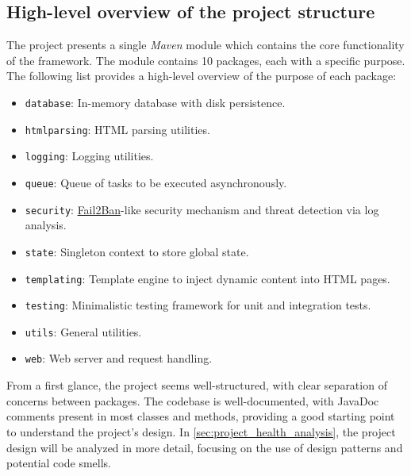\subsection{High-level overview of the project structure}
\label{sec:project_structure}

The project presents a single \textit{Maven} module which contains the core functionality of the framework. The module contains 10 packages, each with a specific purpose. The following list provides a high-level overview of the purpose of each package:

\vspace{1em}
\noindent
\begin{minipage}{0.5\textwidth}
	\begin{itemize}
		\item \texttt{database}: In-memory database with disk persistence.
		\item \texttt{htmlparsing}: HTML parsing utilities.
		\item \texttt{logging}: Logging utilities.
		\item \texttt{queue}: Queue of tasks to be executed asynchronously.
		\item \texttt{security}: \href{https://github.com/fail2ban/fail2ban}{Fail2Ban}-like security mechanism and threat detection via log analysis.
	\end{itemize}
\end{minipage}
\begin{minipage}{0.5\textwidth}
	\begin{itemize}
		\item \texttt{state}: Singleton context to store global state.
		\item \texttt{templating}: Template engine to inject dynamic content into HTML pages.
		\item \texttt{testing}: Minimalistic testing framework for unit and integration tests.
		\item \texttt{utils}: General utilities.
		\item \texttt{web}: Web server and request handling.
	\end{itemize}
\end{minipage}

\noindent From a first glance, the project seems well-structured, with clear separation of concerns between packages. The codebase is well-documented, with JavaDoc comments present in most classes and methods, providing a good starting point to understand the project's design. In \autoref{sec:project_health_analysis}, the project design will be analyzed in more detail, focusing on the use of design patterns and potential code smells.

